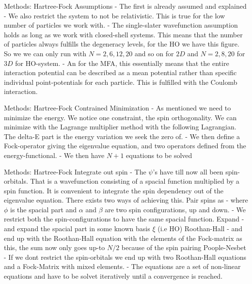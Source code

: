 \documentclass[10pt]{beamer}
\begin{document}
\begin{frame}[standout]{Methods: Hartree-Fock}
    Assumptions
        - The first is already assumed and explained
        - We also restrict the system to not be relativistic. This is true for the low number of particles we work with.
        - The single-slater wavefunction assumption holds as long as we work
        with closed-shell systems. This means that the number of particles
        always fulfills the degeneracy levels, for the HO we have this figure.
        So we we can only run with $N=2,6,12,20$ and so on for $2D$ and
        $N=2,8,20$ for $3D$ for HO-system.
        - An for the MFA, this essentially means that the entire interaction
        potential can be described as a mean potential rather than specific
        individual point-potentials for each particle. This is fulfilled with
        the Coulomb interaction.
\end{frame}

\begin{frame}[standout]{Methods: Hartree-Fock}
    Contrained Minimization
        - As mentioned we need to minimize the energy. We notice one
        constraint, the spin orthogonality. We can minimize with the Lagrange
        multiplier method with the following Lagrangian. The delta-E part is
        the energy variation we seek the zero of.
        - We then define a Fock-operator giving the eigenvalue equation, and
        two operators defined from the energy-functional.
        - We then have $N+1$ equations to be solved
\end{frame}

\begin{frame}[fragile]{Methods: Hartree-Fock}
    Integrate out spin
        - The $\psi$'s have till now all been spin-orbitals. That is a
        wavefunction consisting of a spacial function multiplied by a spin
        function. It is convenient to integrate the spin dependency out of the
        eigenvalue equation. There exists two ways of achieving this.
    Pair spins as
        - where $\phi$ is the spacial part and $\alpha$ and $\beta$ are two
        spin configurations, up and down.
        - We restrict both the spin-configurations to have the same spacial
        function.
    Expand
        - and expand the spacial part in some known basis $\xi$ (i.e HO)
    Roothan-Hall
        - and end up with the Roothan-Hall equation with the elements of the
        Fock-matrix as this, the sum now only goes up-to $N/2$ because of the
        spin pairing
    Poople-Nesbet
        - If we dont restrict the spin-orbitals we end up with two Roothan-Hall
        equations and a Fock-Matrix with mixed elements.
    - The equations are a set of non-linear equations and have to be solvet
    iteratively until a convergence is reached.
\end{frame}
\end{document}
